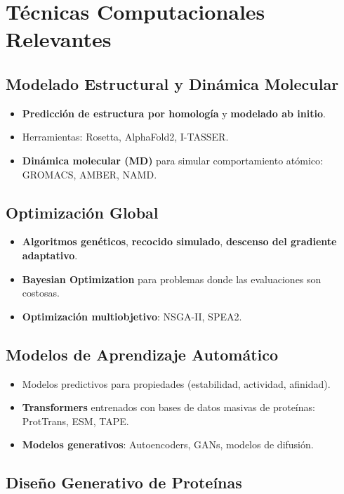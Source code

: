 \documentclass[12pt]{article}
\begin{document}
\section{Técnicas Computacionales Relevantes}

\subsection{Modelado Estructural y Dinámica Molecular}

\begin{itemize}
    \item \textbf{Predicción de estructura por homología} y \textbf{modelado ab initio}.
    \item Herramientas: Rosetta, AlphaFold2, I-TASSER.
    \item \textbf{Dinámica molecular (MD)} para simular comportamiento atómico: GROMACS, AMBER, NAMD.
\end{itemize}

\subsection{Optimización Global}

\begin{itemize}
    \item \textbf{Algoritmos genéticos}, \textbf{recocido simulado}, \textbf{descenso del gradiente adaptativo}.
    \item \textbf{Bayesian Optimization} para problemas donde las evaluaciones son costosas.
    \item \textbf{Optimización multiobjetivo}: NSGA-II, SPEA2.
\end{itemize}

\subsection{Modelos de Aprendizaje Automático}

\begin{itemize}
    \item Modelos predictivos para propiedades (estabilidad, actividad, afinidad).
    \item \textbf{Transformers} entrenados con bases de datos masivas de proteínas: ProtTrans, ESM, TAPE.
    \item \textbf{Modelos generativos}: Autoencoders, GANs, modelos de difusión.
\end{itemize}

\subsection{Diseño Generativo de Proteínas}
\end{document}
